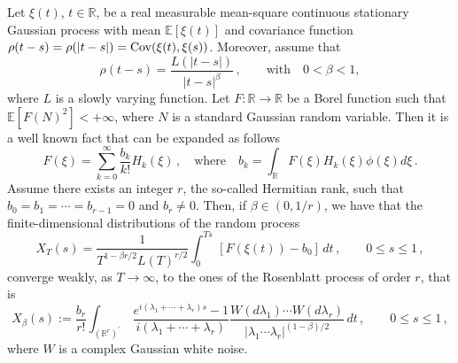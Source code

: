 \documentclass[AHL,Unicode,longabstracts,published]{cedram}
\newcommand{\bbR}{\mathbb{R}}
\newcommand{\bbE}{\mathbb{E}}
\begin{document}
\begin{theo}[{\cite{DM79, Ta:79}}]\label{DMtheorem}
Let $\xi(t)$, $t\in\bbR$, be a real measurable mean-square continuous stationary Gaussian process with mean $\bbE
\left[\xi(t)\right]$ and covariance function $\rho(t-s)=\rho(|t-s|)=
\mathop{\rm Cov}(\xi(t),\xi(s))$. Moreover, assume that
\begin{equation}\label{eq:DM79}
\rho(t-s)=\frac{L(|t-s|)}{|t-s|^{\beta}}\,, \qquad \text{with} \quad 0<\beta<1,
\end{equation}
where $L$ is a slowly varying function. Let $F: \bbR \rightarrow
\bbR$ be a Borel function such that $\bbE\left[F(N)^2\right] <+\infty$, where $N$ is a standard Gaussian random variable. Then it is a well known fact that can be expanded as follows
\begin{equation*}
F(\xi)=\sum_{k=0}^\infty \frac{b_k}{k!}H_k(\xi)\,, \quad \text{where} \quad b_k=\int_{\bbR}F(\xi)H_k(\xi)\phi(\xi)d\xi\,.
\end{equation*}
Assume there exists an integer $r$, the so-called Hermitian rank, such that $ b_0=b_1=\cdots=b_{r-1}=0$ and $b_r\ne0$. Then, if $\beta\in(0,1/r)$, we have that the finite-dimensional distributions of the random process
\begin{equation*}
X_T(s)=\frac{1}{T^{1-\beta r /2}L(T)^{r/2}}\int_{0}^{Ts}\,\left[F(\xi(t))-b_0
\right] \, dt \,, \qquad 0\le s \le1\,,
\end{equation*}
converge weakly, as $T\rightarrow \infty$, to the ones of the Rosenblatt process of order $r$, that is
\begin{equation*}
X_{\beta}(s):=\frac{b_r}{r!}\int_{(\bbR^r)^{\prime}}\,\frac{ e^{i(\lambda_1+\cdots+\lambda_r)s}-1}{i(\lambda_1+\cdots+\lambda_r)}\frac{ W(d\lambda_1)\cdots W(d\lambda_r)}{|\lambda_1\cdots\lambda_r|^{(1-\beta)/2}}
\, dt \,, \qquad 0\le s \le1\,,
\end{equation*}
where $W$ is a complex Gaussian white noise.
\end{theo}
\end{document}
